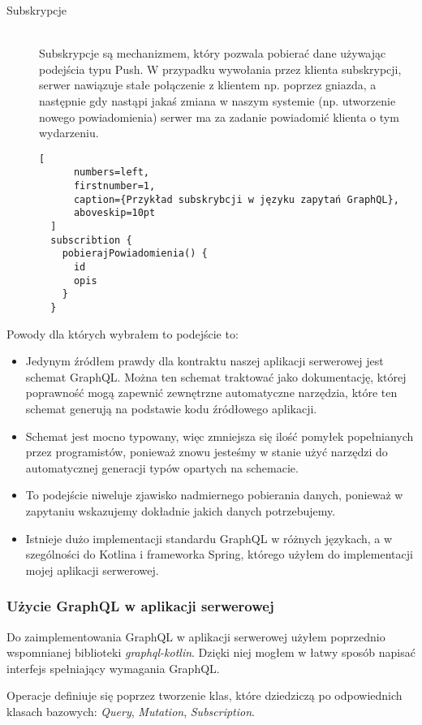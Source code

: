\begin{description}
\item[Subskrypcje] \hfill \\ Subskrypcje są mechanizmem, który pozwala pobierać dane używając podejścia typu Push. W przypadku wywołania przez klienta subskrypcji, serwer nawiązuje stałe połączenie z klientem np. poprzez gniazda, a następnie gdy nastąpi jakaś zmiana w naszym systemie (np. utworzenie nowego powiadomienia) serwer ma za zadanie powiadomić klienta o tym wydarzeniu.
  \begin{addmargin}[6mm]{0mm}
  \begin{lstlisting}[
      numbers=left,
      firstnumber=1,
      caption={Przykład subskrybcji w języku zapytań GraphQL},
      aboveskip=10pt
  ]
  subscribtion {
    pobierajPowiadomienia() {
      id
      opis
    }
  }
  \end{lstlisting}
  \end{addmargin}
\end{description}
Powody dla których wybrałem to podejście to:
\begin{itemize}
  \item Jedynym źródłem prawdy dla kontraktu naszej aplikacji serwerowej jest schemat GraphQL. Można ten schemat traktować jako dokumentację, której poprawność mogą zapewnić zewnętrzne automatyczne narzędzia, które ten schemat generują na podstawie kodu źródłowego aplikacji.
  \item Schemat jest mocno typowany, więc zmniejsza się ilość pomyłek popełnianych przez programistów, ponieważ znowu jesteśmy w stanie użyć narzędzi do automatycznej generacji typów opartych na schemacie.
  \item To podejście niweluje zjawisko nadmiernego pobierania danych, ponieważ w zapytaniu wskazujemy dokładnie jakich danych potrzebujemy.
  \item Istnieje dużo implementacji standardu GraphQL w różnych językach, a w szególności do Kotlina i frameworka Spring, którego użyłem do implementacji mojej aplikacji serwerowej.
\end{itemize}

\subsubsection{Użycie GraphQL w aplikacji serwerowej}
Do zaimplementowania GraphQL w aplikacji serwerowej użyłem poprzednio wspomnianej biblioteki \emph{graphql-kotlin}. Dzięki niej mogłem w łatwy sposób napisać interfejs spełniający wymagania GraphQL. 

Operacje definiuje się poprzez tworzenie klas, które dziedziczą po odpowiednich klasach bazowych: \emph{Query}, \emph{Mutation}, \emph{Subscription}. 

